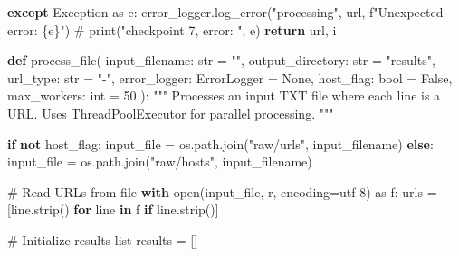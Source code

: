 \documentclass[
  titlepage]{article}
\newenvironment{Shaded}{\begin{snugshade}}{\end{snugshade}}
\newcommand{\BuiltInTok}[1]{\textcolor[rgb]{0.00,0.23,0.31}{#1}}
\newcommand{\CommentTok}[1]{\textcolor[rgb]{0.37,0.37,0.37}{#1}}
\newcommand{\ControlFlowTok}[1]{\textcolor[rgb]{0.00,0.23,0.31}{\textbf{#1}}}
\newcommand{\DecValTok}[1]{\textcolor[rgb]{0.68,0.00,0.00}{#1}}
\newcommand{\ImportTok}[1]{\textcolor[rgb]{0.00,0.46,0.62}{#1}}
\newcommand{\KeywordTok}[1]{\textcolor[rgb]{0.00,0.23,0.31}{\textbf{#1}}}
\newcommand{\NormalTok}[1]{\textcolor[rgb]{0.00,0.23,0.31}{#1}}
\newcommand{\OperatorTok}[1]{\textcolor[rgb]{0.37,0.37,0.37}{#1}}
\newcommand{\PreprocessorTok}[1]{\textcolor[rgb]{0.68,0.00,0.00}{#1}}
\newcommand{\SpecialCharTok}[1]{\textcolor[rgb]{0.37,0.37,0.37}{#1}}
\newcommand{\SpecialStringTok}[1]{\textcolor[rgb]{0.13,0.47,0.30}{#1}}
\newcommand{\StringTok}[1]{\textcolor[rgb]{0.13,0.47,0.30}{#1}}
\newcommand{\VariableTok}[1]{\textcolor[rgb]{0.07,0.07,0.07}{#1}}
\begin{document}
\begin{Shaded}
\begin{Highlighting}[]
    \ControlFlowTok{except} \PreprocessorTok{Exception} \ImportTok{as}\NormalTok{ e:}
\NormalTok{        error\_logger.log\_error(}\StringTok{"processing"}\NormalTok{, url, }\SpecialStringTok{f"Unexpected error: }\SpecialCharTok{\{}\NormalTok{e}\SpecialCharTok{\}}\SpecialStringTok{"}\NormalTok{)}
        \CommentTok{\# print("checkpoint 7, error: ", e)}
        \ControlFlowTok{return}\NormalTok{ url, }\StringTok{\textquotesingle{}i\textquotesingle{}}
\end{Highlighting}
\end{Shaded}

\begin{Shaded}
\begin{Highlighting}[]
\KeywordTok{def}\NormalTok{ process\_file(}
\NormalTok{    input\_filename: }\BuiltInTok{str} \OperatorTok{=} \StringTok{""}\NormalTok{, }
\NormalTok{    output\_directory: }\BuiltInTok{str} \OperatorTok{=} \StringTok{"results"}\NormalTok{,}
\NormalTok{    url\_type: }\BuiltInTok{str} \OperatorTok{=} \StringTok{"{-}"}\NormalTok{, }
\NormalTok{    error\_logger: ErrorLogger }\OperatorTok{=} \VariableTok{None}\NormalTok{, }
\NormalTok{    host\_flag: }\BuiltInTok{bool} \OperatorTok{=} \VariableTok{False}\NormalTok{, }
\NormalTok{    max\_workers: }\BuiltInTok{int} \OperatorTok{=} \DecValTok{50}
\NormalTok{        ):}
    \CommentTok{"""}
\CommentTok{    Processes an input TXT file where each line is a URL.}
\CommentTok{    Uses ThreadPoolExecutor for parallel processing.}
\CommentTok{    """}

    \ControlFlowTok{if} \KeywordTok{not}\NormalTok{ host\_flag:}
\NormalTok{        input\_file }\OperatorTok{=}\NormalTok{ os.path.join(}\StringTok{"raw/urls"}\NormalTok{, input\_filename)}
    \ControlFlowTok{else}\NormalTok{:}
\NormalTok{        input\_file }\OperatorTok{=}\NormalTok{ os.path.join(}\StringTok{"raw/hosts"}\NormalTok{, input\_filename)}
    
    \CommentTok{\# Read URLs from file}
    \ControlFlowTok{with} \BuiltInTok{open}\NormalTok{(input\_file, }\StringTok{\textquotesingle{}r\textquotesingle{}}\NormalTok{, encoding}\OperatorTok{=}\StringTok{\textquotesingle{}utf{-}8\textquotesingle{}}\NormalTok{) }\ImportTok{as}\NormalTok{ f:}
\NormalTok{        urls }\OperatorTok{=}\NormalTok{ [line.strip() }\ControlFlowTok{for}\NormalTok{ line }\KeywordTok{in}\NormalTok{ f }\ControlFlowTok{if}\NormalTok{ line.strip()]}
    
    \CommentTok{\# Initialize results list}
\NormalTok{    results }\OperatorTok{=}\NormalTok{ []}
    

\end{Highlighting}
\end{Shaded}
\end{document}
